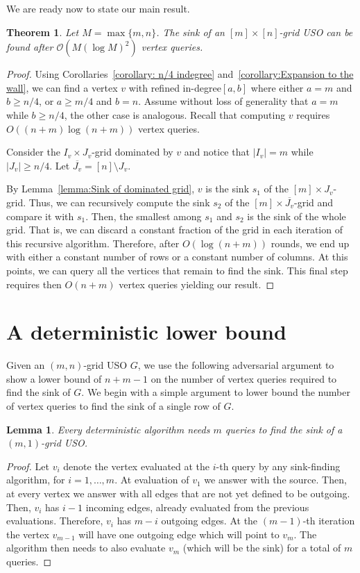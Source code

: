 \documentclass[a4paper,10pt]{article}
\newtheorem{lemma}{Lemma}
\newtheorem{theorem}{Theorem}
\newcommand{\indegree}{refined in-degree\xspace}
\begin{document}
We are ready now to state our main result.

\begin{theorem}\label{theorem:Sink algorithm}
 Let $M = \max\{m,n\}$. The sink of an $[m]\times[n]$-grid USO can be found after $\mathcal{O}(M(\log M)^2)$ vertex queries.
\end{theorem}
\begin{proof}
Using  Corollaries~\ref{corollary: n/4 indegree} and~\ref{corollary:Expansion to the wall}, we can find a vertex $v$ with \indegree $[a,b]$ where either $a = m$ and $b \geq  n/4$, or $a \geq  m/4$ and $b  = n$. Assume without loss of generality that $a = m$ while $b\geq  n/4$, the other case is analogous. Recall that computing $v$ requires $O((n + m) \log (n+m))$ vertex queries.

Consider the $I_v\times J_v$-grid dominated by $v$ and 
notice that $|I_v| = m$ while $|J_v| \geq n/4$. Let $\overline{J_v} = [n]\setminus J_v$.

By Lemma~\ref{lemma:Sink of dominated grid}, $v$ is the sink $s_1$ of the $[m] \times J_v$-grid. Thus, we can recursively compute the sink $s_2$ of the $[m]\times \overline{J_v}$-grid and compare it with $s_1$. Then, the smallest among $s_1$ and $s_2$ is the sink of the whole grid.
That is, we can discard a constant fraction of the grid in each iteration of this recursive algorithm. Therefore, after $O(\log (n + m))$ rounds, we end up with either a constant number of rows or a constant number of columns. At this points, we can query all the vertices that remain to find the sink. This final step requires then $O(n + m)$ vertex queries yielding our result.
\end{proof}

 
\section{A deterministic lower bound}

Given an $(m, n)$-grid USO $G$, we use the following adversarial argument to show a lower bound of $n + m -1$ on the number of vertex queries required to find the sink of $G$.
We begin with a simple argument to lower bound the number of vertex queries to find the sink of a single row of $G$.

\begin{lemma}\label{lem:kx1}
Every deterministic algorithm needs $m$ queries to find the sink of a $(m,1)$-grid USO. 
\end{lemma}
\begin{proof}
Let $v_i$ denote the vertex evaluated at the $i$-th query by any sink-finding algorithm, for $i=1,\ldots, m$. At evaluation of $v_1$ we answer with the source. Then, at every vertex 
we answer with all edges that are not yet defined to be outgoing. Then, $v_i$ has $i-1$ incoming edges, already evaluated from the previous evaluations. 
Therefore, $v_i$ has $m-i$ outgoing edges. At the $(m-1)$-th iteration the vertex $v_{m-1}$ will have one outgoing edge which will point to $v_m$.
The algorithm then needs to also evaluate $v_m$ (which will be the sink) for a total of $m$ queries. 
\end{proof}
\end{document}
